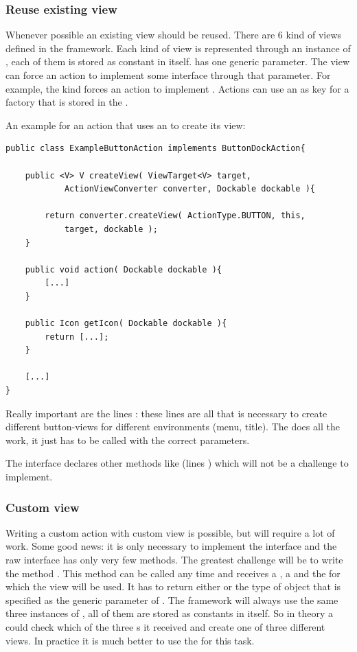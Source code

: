 \subsubsection{Reuse existing view}
Whenever possible an existing view should be reused. There are 6 kind of views defined in the framework. Each kind of view is represented through an instance of , each of them is stored as constant in  itself.  has one generic parameter. The view can force an action to implement some interface through that parameter. For example, the kind  forces an action to implement . Actions can use an  as key for a factory that is stored in the . 

An example for an action that uses an  to create its view:
\begin{lstlisting}
public class ExampleButtonAction implements ButtonDockAction{

	public <V> V createView( ViewTarget<V> target,
			ActionViewConverter converter, Dockable dockable ){
	
		return converter.createView( ActionType.BUTTON, this, 
			target, dockable );
	}
	
	public void action( Dockable dockable ){
		[...]
	}
	
	public Icon getIcon( Dockable dockable ){
		return [...];
	}
	
	[...]
}
\end{lstlisting}
Really important are the lines : these lines are all that is necessary to create different button-views for different environments (menu, title). The  does all the work, it just has to be called with the correct parameters.

The interface  declares other methods like  (lines ) which will not be a challenge to implement.

\subsubsection{Custom view}
Writing a custom action with custom view is possible, but will require a lot of work. Some good news: it is only necessary to implement the interface  and the raw interface  has only very few methods. The greatest challenge will be to write the method . This method can be called any time and receives a , a  and the  for which the view will be used. It has to return either  or the type of object that is specified as the generic parameter of . The framework will always use the same three instances of , all of them are stored as constants in  itself. So in theory a  could check which of the three s it received and create one of three different views. In practice it is much better to use the  for this task.

